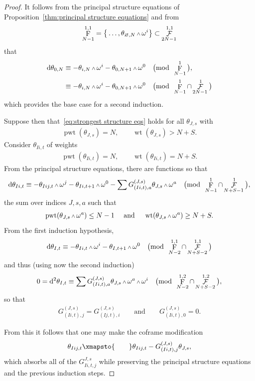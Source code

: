 \documentclass[pdftex]{sigma}
\renewcommand{\d}{{\rm d}}
\renewcommand{\mod}[1]{\quad\big(\mathrm{mod\enspace} #1\big)}
\newcommand{\w}{{\mathchoice{\,{\scriptstyle\wedge}\,}{{\scriptstyle\wedge}}
 {{\scriptscriptstyle\wedge}}{{\scriptscriptstyle\wedge}}}}
\newcommand{\thetas}[1]{\theta_{#1}}
\DeclareMathOperator{\pwf}{F}
\DeclareMathOperator{\swf}{\mathcal{F}}
\DeclareMathOperator{\wt}{\mathrm{wt}}
\DeclareMathOperator{\pwt}{\mathrm{pwt}}
\numberwithin{equation}{section}
\begin{document}
\begin{Example}
\begin{proof}
 It follows from the principal structure equations of Proposition~\ref{thm:principal structure equations} and from
 \begin{gather*}
 \pwf^{1,1}_{N-1} = \big\{\dots, \thetas{\varnothing,N}\w\omega^i\big\} \subset \swf^{1,1}_{2N-1}
 \end{gather*}
 that
 \begin{align*}
 \d\theta_{0,N} & \equiv -\thetas{i,N}\w\omega^i - \thetas{0,N+1}\w\omega^0 \mod{\pwf^1_{N-1}}, \\
 & \equiv -\thetas{i,N}\w\omega^i - \thetas{0,N+1}\w\omega^0 \mod{\pwf^1_{N-1}\cap\swf^1_{2N-1}}
 \end{align*}
 which provides the base case for a second induction.

 Suppose then that~\eqref{eq:strongest structure eqs} holds for all $\thetas{J,s}$ with
 \begin{gather*}
 \pwt(\thetas{J,s}) = N , \qquad \wt(\thetas{J,s}) > N + S .
 \end{gather*}
 Consider $\thetas{Ii,t}$ of weights
 \begin{gather*}
 \pwt(\thetas{Ii,t}) = N, \qquad \wt(\thetas{Ii,t}) = N + S .
 \end{gather*}
 From the principal structure equations, there are functions so that
 \begin{gather*}
 \d\thetas{Ii,t} \equiv -\thetas{Iij,t}\w\omega^j - \thetas{Ii,t+1}\w\omega^0 - \sum G^{(J,s)}_{(Ii,t),a}\thetas{J,s}\w\omega^a \mod{\pwf^1_{N-1}\cap\swf^1_{N+S-1}} ,
 \end{gather*}
 the sum over indices $J, s, a$ such that
 \begin{gather*}
 \pwt(\thetas{J,s}\w\omega^a) \le N-1 \quad \mbox{ and } \quad \wt(\thetas{J,s}\w\omega^a) \ge N + S .
 \end{gather*}
 From the first induction hypothesis,
 \begin{gather*}
 \d\thetas{I,t} \equiv - \thetas{Ii,t}\w\omega^i - \thetas{I,t+1}\w\omega^0 \mod{\pwf^{1,1}_{N-2}\cap\swf^{1,1}_{N+S-2}}
 \end{gather*}
 and thus (using now the second induction)
 \begin{gather*}
 0 = \d^2\thetas{I,t} \equiv \sum G^{(J,s)}_{(Ii,t),a}\thetas{J,s}\w\omega^a\w\omega^i \mod{\pwf^{1,2}_{N-2}\cap\swf^{1,2}_{N+S-2}} ,
 \end{gather*}
 so that
 \begin{gather*}
 G^{(J,s)}_{(Ii,t),j} = G^{(J,s)}_{(Ij,t),i} \qquad \text{and} \qquad G^{(J,s)}_{(Ii,t),0} = 0 .
 \end{gather*}

 From this it follows that one may make the coframe modification
 \begin{gather*}
 \thetas{Iij,t} \xmapsto{\qquad} \thetas{Iij,t} - G^{(J,s)}_{(Ii,t),j}\thetas{J,s} ,
 \end{gather*}
 which absorbs all of the $G^{J,s}_{Ii,t,j}$ while preserving the principal structure equations and the previous induction steps.
 \end{proof}

\end{Example}
\end{document}
